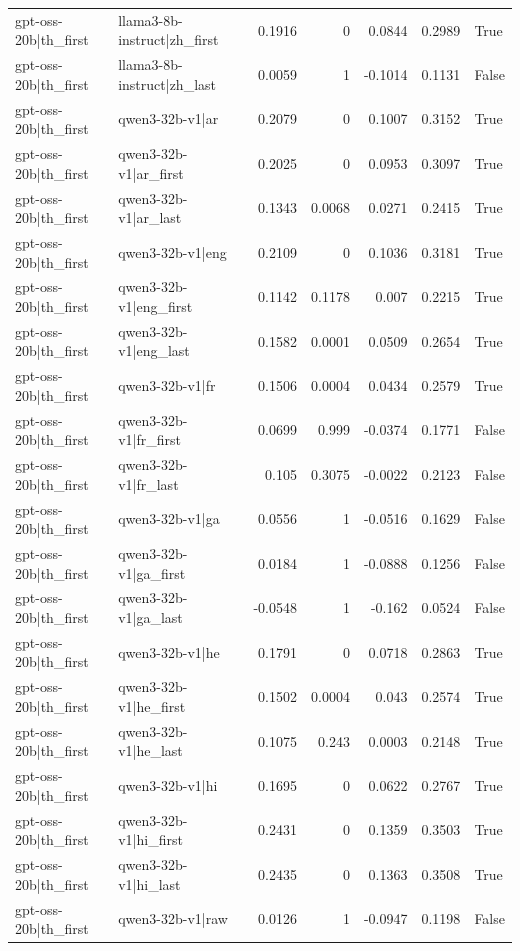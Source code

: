 \begin{table}
\begin{tabular}{l l r r r r l}
gpt-oss-20b|th_first & llama3-8b-instruct|zh_first & 0.1916 & 0 & 0.0844 & 0.2989 & True \\
gpt-oss-20b|th_first & llama3-8b-instruct|zh_last & 0.0059 & 1 & -0.1014 & 0.1131 & False \\
gpt-oss-20b|th_first & qwen3-32b-v1|ar & 0.2079 & 0 & 0.1007 & 0.3152 & True \\
gpt-oss-20b|th_first & qwen3-32b-v1|ar_first & 0.2025 & 0 & 0.0953 & 0.3097 & True \\
gpt-oss-20b|th_first & qwen3-32b-v1|ar_last & 0.1343 & 0.0068 & 0.0271 & 0.2415 & True \\
gpt-oss-20b|th_first & qwen3-32b-v1|eng & 0.2109 & 0 & 0.1036 & 0.3181 & True \\
gpt-oss-20b|th_first & qwen3-32b-v1|eng_first & 0.1142 & 0.1178 & 0.007 & 0.2215 & True \\
gpt-oss-20b|th_first & qwen3-32b-v1|eng_last & 0.1582 & 0.0001 & 0.0509 & 0.2654 & True \\
gpt-oss-20b|th_first & qwen3-32b-v1|fr & 0.1506 & 0.0004 & 0.0434 & 0.2579 & True \\
gpt-oss-20b|th_first & qwen3-32b-v1|fr_first & 0.0699 & 0.999 & -0.0374 & 0.1771 & False \\
gpt-oss-20b|th_first & qwen3-32b-v1|fr_last & 0.105 & 0.3075 & -0.0022 & 0.2123 & False \\
gpt-oss-20b|th_first & qwen3-32b-v1|ga & 0.0556 & 1 & -0.0516 & 0.1629 & False \\
gpt-oss-20b|th_first & qwen3-32b-v1|ga_first & 0.0184 & 1 & -0.0888 & 0.1256 & False \\
gpt-oss-20b|th_first & qwen3-32b-v1|ga_last & -0.0548 & 1 & -0.162 & 0.0524 & False \\
gpt-oss-20b|th_first & qwen3-32b-v1|he & 0.1791 & 0 & 0.0718 & 0.2863 & True \\
gpt-oss-20b|th_first & qwen3-32b-v1|he_first & 0.1502 & 0.0004 & 0.043 & 0.2574 & True \\
gpt-oss-20b|th_first & qwen3-32b-v1|he_last & 0.1075 & 0.243 & 0.0003 & 0.2148 & True \\
gpt-oss-20b|th_first & qwen3-32b-v1|hi & 0.1695 & 0 & 0.0622 & 0.2767 & True \\
gpt-oss-20b|th_first & qwen3-32b-v1|hi_first & 0.2431 & 0 & 0.1359 & 0.3503 & True \\
gpt-oss-20b|th_first & qwen3-32b-v1|hi_last & 0.2435 & 0 & 0.1363 & 0.3508 & True \\
gpt-oss-20b|th_first & qwen3-32b-v1|raw & 0.0126 & 1 & -0.0947 & 0.1198 & False \\

\end{tabular}
\end{table}
